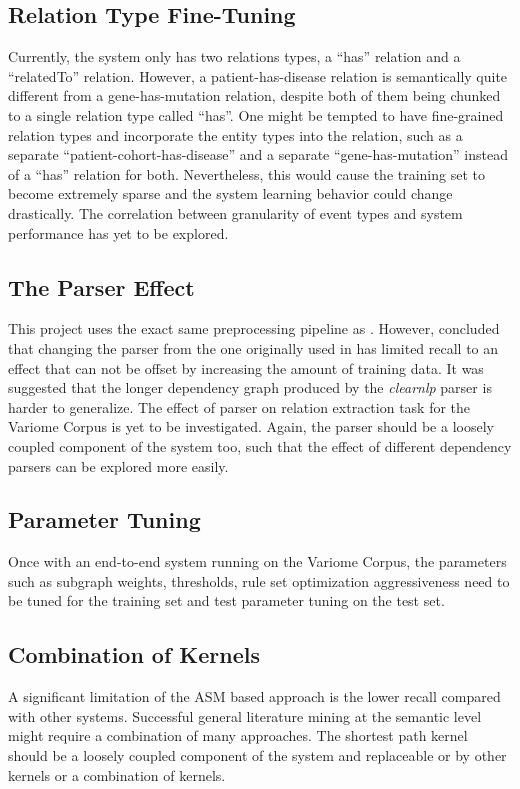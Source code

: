 \subsection{Relation Type Fine-Tuning}
Currently, the system only has two relations types, a ``has'' relation and a ``relatedTo'' relation. However, a patient-has-disease relation is semantically quite different from a gene-has-mutation relation, despite both of them being chunked to a single relation type called ``has''. One might be tempted to have fine-grained relation types and incorporate the entity types into the relation, such as a separate ``patient-cohort-has-disease'' and a separate  ``gene-has-mutation'' instead of a ``has'' relation for both. Nevertheless, this would cause the training set to become extremely sparse and the system learning behavior could change drastically. The correlation between granularity of event types and system performance has yet to be explored.  
\subsection{The Parser Effect}
This project uses the exact same preprocessing pipeline as \cite{mackinlay2013extracting}. However, \citet*{mackinlay2013extracting} concluded that changing the parser from the one originally used in \cite{liu2013approximate} has limited recall to an effect that can not be offset by increasing the amount of training data. It was suggested that the longer dependency graph produced by the \emph{clearnlp} parser is harder to generalize. The effect of parser on relation extraction task for the Variome Corpus is yet to be investigated. Again, the parser should be a loosely coupled component of the system too, such that the effect of different dependency parsers can be explored more easily.
\subsection{Parameter Tuning}
Once with an end-to-end system running on the Variome Corpus, the parameters such as subgraph weights, thresholds, rule set optimization aggressiveness need to be tuned for the training set and test parameter tuning on the test set.
\subsection{Combination of Kernels}
A significant limitation of the ASM based approach is the lower recall compared with other systems. 
Successful general literature mining at the semantic level might require a combination of many approaches. The shortest path kernel should be a loosely coupled component of the system and replaceable or by other kernels or a combination of kernels. 
